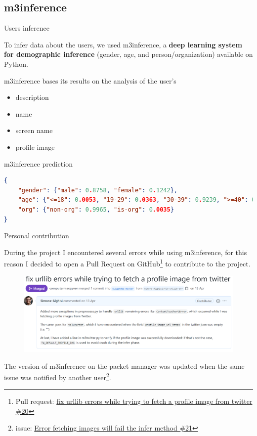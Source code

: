 \documentclass[8pt]{beamer}  %
\begin{document}
\subsection{m3inference}
\begin{frame}[fragile]{Users inference}

	To infer data about the users, we used m3inference\autocite{wang2019demographic}, a \textbf{deep learning system for demographic inference} (gender, age, and person/organization) available on Python.
	
	m3inference bases its results on the analysis of the user's
	
	\begin{itemize}
	    \item description
	    \item name 
	    \item screen name
	    \item profile image
	\end{itemize}
	
	\begin{block}{m3inference prediction}
	    \begin{lstlisting}[language=json]
{
    "gender": {"male": 0.8758, "female": 0.1242}, 
    "age": {"<=18": 0.0053, "19-29": 0.0363, "30-39": 0.9239, ">=40": 0.0346}, 
    "org": {"non-org": 0.9965, "is-org": 0.0035}
}
	    \end{lstlisting}
	\end{block}
	
\end{frame}

\begin{frame}{Personal contribution}

	During the project I encountered several errors while using m3inference, for this reason I decided to open a Pull Request on GitHub\footnote{Pull request: \href{https://github.com/euagendas/m3inference/pull/20}{fix urllib errors while trying to fetch a profile image from twitter \#20}} to contribute to the project.
	
	\begin{figure}
	    \centering
	    \includegraphics[scale=0.165]{assets/img/pull_request.png}
	\end{figure}
	
	The version of m3inference on the packet manager was updated when the same issue was notified by another user\footnote{issue: \href{https://github.com/euagendas/m3inference/issues/21}{Error fetching images will fail the infer method \#21}}.
	
\end{frame}
\end{document}

